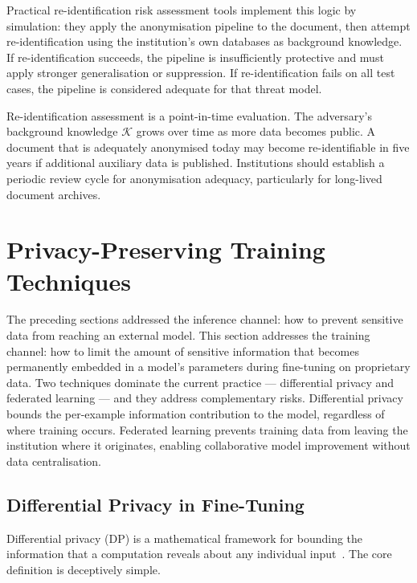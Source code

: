 Practical re-identification risk assessment tools implement this logic by simulation: they apply the anonymisation pipeline to the document, then attempt re-identification using the institution's own databases as background knowledge. If re-identification succeeds, the pipeline is insufficiently protective and must apply stronger generalisation or suppression. If re-identification fails on all test cases, the pipeline is considered adequate for that threat model.

\begin{remark}
Re-identification assessment is a point-in-time evaluation. The adversary's background knowledge $\mathcal{K}$ grows over time as more data becomes public. A document that is adequately anonymised today may become re-identifiable in five years if additional auxiliary data is published. Institutions should establish a periodic review cycle for anonymisation adequacy, particularly for long-lived document archives.
\end{remark}

\section{Privacy-Preserving Training Techniques}
\label{sec:ch15-privacy-training}

\begin{context}
The preceding sections addressed the inference channel: how to prevent sensitive data from reaching an external model. This section addresses the training channel: how to limit the amount of sensitive information that becomes permanently embedded in a model's parameters during fine-tuning on proprietary data. Two techniques dominate the current practice — differential privacy and federated learning — and they address complementary risks. Differential privacy bounds the per-example information contribution to the model, regardless of where training occurs. Federated learning prevents training data from leaving the institution where it originates, enabling collaborative model improvement without data centralisation.
\end{context}

\subsection{Differential Privacy in Fine-Tuning}
\label{sec:ch15-dp}

Differential privacy (DP) is a mathematical framework for bounding the information that a computation reveals about any individual input~\citep{dwork2014algorithmic}. The core definition is deceptively simple.

